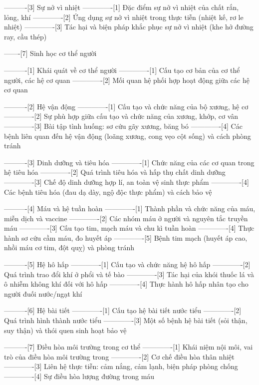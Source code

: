 ----------[3] Sự nở vì nhiệt
-------------[1] Đặc điểm sự nở vì nhiệt của chất rắn, lỏng, khí
-------------[2] Ứng dụng sự nở vì nhiệt trong thực tiễn (nhiệt kế, rơ le nhiệt)
-------------[3] Tác hại và biện pháp khắc phục sự nở vì nhiệt (khe hở đường ray, cầu thép)

-------[7] Sinh học cơ thể người

----------[1] Khái quát về cơ thể người
-------------[1] Cấu tạo cơ bản của cơ thể người, các hệ cơ quan
-------------[2] Mối quan hệ phối hợp hoạt động giữa các hệ cơ quan

----------[2] Hệ vận động
-------------[1] Cấu tạo và chức năng của bộ xương, hệ cơ
-------------[2] Sự phù hợp giữa cấu tạo và chức năng của xương, khớp, cơ vân
-------------[3] Bài tập tình huống: sơ cứu gãy xương, băng bó
-------------[4] Các bệnh liên quan đến hệ vận động (loãng xương, cong vẹo cột sống) và cách phòng tránh

----------[3] Dinh dưỡng và tiêu hóa
-------------[1] Chức năng của các cơ quan trong hệ tiêu hóa
-------------[2] Quá trình tiêu hóa và hấp thụ chất dinh dưỡng
-------------[3] Chế độ dinh dưỡng hợp lí, an toàn vệ sinh thực phẩm
-------------[4] Các bệnh tiêu hóa (đau dạ dày, ngộ độc thực phẩm) và cách bảo vệ

----------[4] Máu và hệ tuần hoàn
-------------[1] Thành phần và chức năng của máu, miễn dịch và vaccine
-------------[2] Các nhóm máu ở người và nguyên tắc truyền máu
-------------[3] Cấu tạo tim, mạch máu và chu kì tuần hoàn
-------------[4] Thực hành sơ cứu cầm máu, đo huyết áp
-------------[5] Bệnh tim mạch (huyết áp cao, nhồi máu cơ tim, đột quỵ) và phòng tránh

----------[5] Hệ hô hấp
-------------[1] Cấu tạo và chức năng hệ hô hấp
-------------[2] Quá trình trao đổi khí ở phổi và tế bào
-------------[3] Tác hại của khói thuốc lá và ô nhiễm không khí đối với hô hấp
-------------[4] Thực hành hô hấp nhân tạo cho người đuối nước/ngạt khí

----------[6] Hệ bài tiết
-------------[1] Cấu tạo hệ bài tiết nước tiểu
-------------[2] Quá trình hình thành nước tiểu
-------------[3] Một số bệnh hệ bài tiết (sỏi thận, suy thận) và thói quen sinh hoạt bảo vệ

----------[7] Điều hòa môi trường trong cơ thể
-------------[1] Khái niệm nội môi, vai trò của điều hòa môi trường trong
-------------[2] Cơ chế điều hòa thân nhiệt
-------------[3] Liên hệ thực tiễn: cảm nắng, cảm lạnh, biện pháp phòng chống
-------------[4] Sự điều hòa lượng đường trong máu

